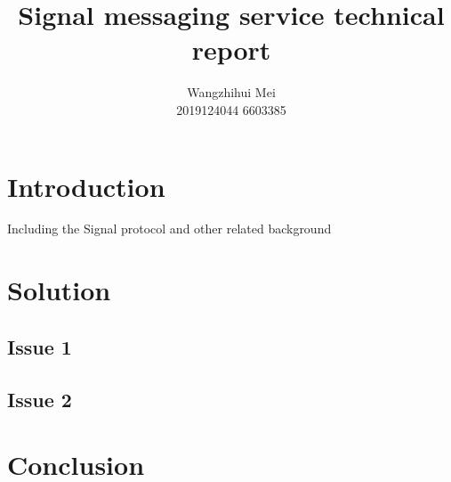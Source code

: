 \documentclass[11pt,en]{elegantpaper}
\title{Signal messaging service technical report}
\author{Wangzhihui Mei \\ 2019124044 6603385}
\institute{CCNU-UOW JI}
\date{}
\begin{document}
\maketitle

\begin{abstract}
	
\end{abstract}

\section{Introduction}
Including the Signal protocol and other related background


\section{Solution}
\subsection{Issue 1}
\subsection{Issue 2}


\section{Conclusion}


\end{document}

